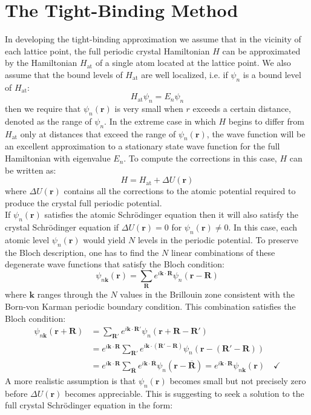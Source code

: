 \documentclass[10.75pt,a4paper,openright,bottom=2cm]{article}
\renewcommand{\Vec}[1]{\boldsymbol{#1}}
\begin{document}
\section{The Tight-Binding Method}
In developing the tight-binding approximation we assume that in the vicinity of each lattice point, the full periodic crystal Hamiltonian $H$ can be approximated by the Hamiltonian $H_{\text{at}}$ of a single atom located at the lattice point. We also assume that the bound levels of $H_{\text{at}}$ are well localized, i.e. if $\psi_n$ is a bound level of $H_{\text{at}}$:
\[
H_{\text{at}}\psi_n=E_n\psi_n
\]
then we require that $\psi_n(\Vec{r})$ is very small when $r$ exceeds a certain distance, denoted as the range of $\psi_n$. In the extreme case in which $H$ begins to differ from $H_{\text{at}}$ only at distances that exceed the range of $\psi_n(\Vec{r})$, the wave function will be an excellent approximation to a stationary state wave function for the full Hamiltonian with eigenvalue $E_n$. To compute the corrections in this case, $H$ can be written as:
\[
H=H_{\text{at}}+\Delta U(\Vec{r})
\]
where $\Delta U(\Vec{r})$ contains all the corrections to the atomic potential required to produce the crystal full periodic potential.\\
If $\psi_n(\Vec{r})$ satisfies the atomic Schr\"odinger equation then it will also satisfy the crystal Schr\"odinger equation if $\Delta U(\Vec{r})=0$ for $\psi_n(\Vec{r})\neq0$. In this case, each atomic level $\psi_n(\Vec{r})$ would yield $N$ levels in the periodic potential. To preserve the Bloch description, one has to find the $N$ linear combinations of these degenerate wave functions that satisfy the Bloch condition:
\[
\psi_{n\Vec{k}}(\Vec{r})=\sum_{\Vec{R}}e^{i\Vec{k}\cdot\Vec{R}}\psi_n(\Vec{r}-\Vec{R})
\]
where $\Vec{k}$ ranges through the $N$ values in the  Brillouin zone consistent with the Born-von Karman periodic boundary condition. This combination satisfies the Bloch condition:
\begin{align*}
\psi_{n\Vec{k}}(\Vec{r}+\Vec{R})&=\sum_{\Vec{R'}}e^{i\Vec{k}\cdot\Vec{R'}}\psi_n(\Vec{r}+\Vec{R}-\Vec{R'})\\
&=e^{i\Vec{k}\cdot\Vec{R}}\sum_{\Vec{R'}}e^{i\Vec{k}\cdot(\Vec{R'}-\Vec{R})}\psi_n(\Vec{r}-(\Vec{R'}-\Vec{R}))\\
&=e^{i\Vec{k}\cdot\Vec{R}}\sum_{\Vec{\overline{R}}}e^{i\Vec{k}\cdot\Vec{\overline{R}}}\psi_n(\Vec{r}-\Vec{\overline{R}})=e^{i\Vec{k}\cdot\Vec{R}}\psi_{n\Vec{k}}(\Vec{r}) \quad \checkmark
\end{align*}
A more realistic assumption is that $\psi_n(\Vec{r})$ becomes small but not precisely zero before $\Delta U(\Vec{r})$ becomes appreciable. This is suggesting to seek a solution to the full crystal Schr\"odinger equation in the form:
\end{document}

